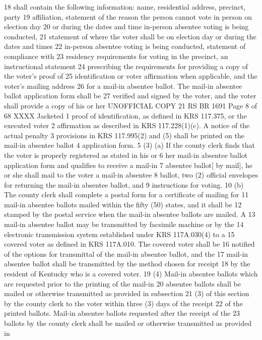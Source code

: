 18 shall contain the following information: name, residential address, precinct, party
19 affiliation, statement of the reason the person cannot vote in person on election day
20 or during the dates and time in-person absentee voting is being conducted,
21 statement of where the voter shall be on election day or during the dates and times
22 in-person absentee voting is being conducted, statement of compliance with
23 residency requirements for voting in the precinct, an instructional statement
24 prescribing the requirements for providing a copy of the voter's proof of
25 identification or voter affirmation when applicable, and the voter's mailing address
26 for a mail-in absentee ballot. The mail-in absentee ballot application form shall be
27 verified and signed by the voter, and the voter shall provide a copy of his or her 
UNOFFICIAL COPY 21 RS BR 1691
Page 8 of 68
XXXX Jacketed
1 proof of identification, as defined in KRS 117.375, or the executed voter
2 affirmation as described in KRS 117.228(1)(c). A notice of the actual penalty
3 provisions in KRS 117.995(2) and (5) shall be printed on the mail-in absentee ballot
4 application form.
5 (3) (a) If the county clerk finds that the voter is properly registered as stated in his or
6 her mail-in absentee ballot application form and qualifies to receive a mail-in
7 absentee ballot[ by mail], he or she shall mail to the voter a mail-in absentee
8 ballot, two (2) official envelopes for returning the mail-in absentee ballot, and
9 instructions for voting.
10 (b) The county clerk shall complete a postal form for a certificate of mailing for
11 mail-in absentee ballots mailed within the fifty (50) states, and it shall be
12 stamped by the postal service when the mail-in absentee ballots are mailed. A
13 mail-in absentee ballot may be transmitted by facsimile machine or by the
14 electronic transmission system established under KRS 117A.030(4) to a
15 covered voter as defined in KRS 117A.010. The covered voter shall be
16 notified of the options for transmittal of the mail-in absentee ballot, and the
17 mail-in absentee ballot shall be transmitted by the method chosen for receipt
18 by the resident of Kentucky who is a covered voter.
19 (4) Mail-in absentee ballots which are requested prior to the printing of the mail-in
20 absentee ballots shall be mailed or otherwise transmitted as provided in subsection
21 (3) of this section by the county clerk to the voter within three (3) days of the receipt
22 of the printed ballots. Mail-in absentee ballots requested after the receipt of the
23 ballots by the county clerk shall be mailed or otherwise transmitted as provided in
